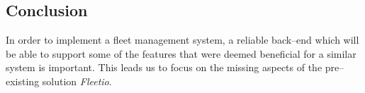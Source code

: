 \subsection{Conclusion}\label{sub:Assessment}
In order to implement a fleet management system, a reliable back--end which will be able to support some of the features that were deemed beneficial for a similar system is important.
This leads us to focus on the missing aspects of the pre--existing solution \textit{Fleetio}. 
